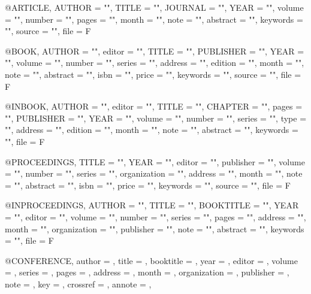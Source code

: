 
@ARTICLE{,
  AUTHOR =       "",
  TITLE =        "",
  JOURNAL =      "",
  YEAR =         "",
  volume =       "",
  number =       "",
  pages =        "",
  month =        "",
  note =         "",
  abstract =     "",
  keywords =     "",
  source =       "",
  file = F
}

@BOOK{,
  AUTHOR =       "",
  editor =       "",
  TITLE =        "",
  PUBLISHER =    "",
  YEAR =         "",
  volume =       "",
  number =       "",
  series =       "",
  address =      "",
  edition =      "",
  month =        "",
  note =         "",
  abstract =     "",
  isbn =         "",
  price =        "",
  keywords =     "",
  source =       "",
  file = F
}

@INBOOK{,
  AUTHOR =       "",
  editor =       "",
  TITLE =        "",
  CHAPTER =      "",
  pages =        "",
  PUBLISHER =    "",
  YEAR =         "",
  volume =       "",
  number =       "",
  series =       "",
  type =         "",
  address =      "",
  edition =      "",
  month =        "",
  note =         "",
  abstract =     "",
  keywords =     "",
  file = F
}

@PROCEEDINGS{,
  TITLE =        "",
  YEAR =         "",
  editor =       "",
  publisher =    "",
  volume =       "",
  number =       "",
  series =       "",
  organization = "",
  address =      "",
  month =        "",
  note =         "",
  abstract =     "",
  isbn =         "",
  price =        "",
  keywords =     "",
  source =       "",
  file = F
}

@INPROCEEDINGS{,
  AUTHOR =       "",
  TITLE =        "",
  BOOKTITLE =    "",
  YEAR =         "",
  editor =       "",
  volume =       "",
  number =       "",
  series =       "",
  pages =        "",
  address =      "",
  month =        "",
  organization = "",
  publisher =    "",
  note =         "",
  abstract =     "",
  keywords =     "",
  file = F
}

@CONFERENCE{,
  author =       {},
  title =        {},
  booktitle =    {},
  year =         {},
  editor =       {},
  volume =       {},
  series =       {},
  pages  =       {},
  address =      {},
  month =        {},
  organization = {},
  publisher =    {},
  note =         {},
  key =          {},
  crossref =     {},
  annote =       {},
}

